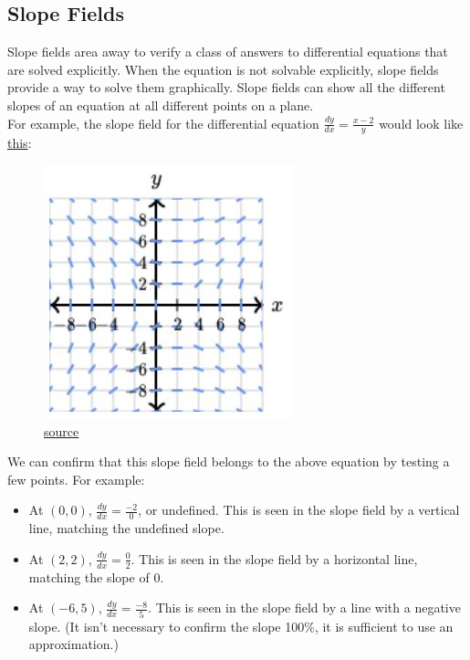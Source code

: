 \documentclass[12pt]{article}
\begin{document}
        \subsection{Slope Fields}
            Slope fields area away to verify a class of answers to differential equations that are solved explicitly. When the equation is not solvable explicitly, slope fields provide a way to solve them graphically. Slope fields can show all the different slopes of an equation at all different points on a plane.
            \\ For example, the slope field for the differential equation $\frac{dy}{dx} = \frac{x-2}{y}$ would look like \hyperref[fig:slopefield1]{this}:
            \begin{figure}[H]
                \begin{center}
                    \includegraphics{fig13.JPG}
                    \caption{\href{https://www.khanacademy.org/math/ap-calculus-bc/bc-differential-equations-new}{source}}
                    \label{fig:slopefield1}
                \end{center}
            \end{figure}
            We can confirm that this slope field belongs to the above equation by testing a few points. For example:
            \begin{itemize}
                \item At $(0, 0)$, $\frac{dy}{dx} = \frac{-2}{0}$, or undefined. This is seen in the slope field by a vertical line, matching the undefined slope.
                \item At $(2, 2)$, $\frac{dy}{dx} = \frac{0}{2}$. This is seen in the slope field by a horizontal line, matching the slope of $0$.
                \item At $(-6, 5)$, $\frac{dy}{dx} = \frac{-8}{5}$. This is seen in the slope field by a line with a negative slope. (It isn't necessary to confirm the slope 100\%, it is sufficient to use an approximation.)
            \end{itemize}
\end{document}
